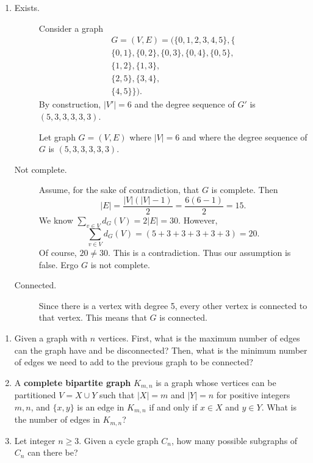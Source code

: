 \documentclass{article}
\theoremstyle{definition}
\begin{document}
\begin{solution}
\begin{enumerate}
\item\begin{description}
\item[Exists. ]Consider a graph
\begin{align*}
G=(V,E)=(\{0,1,2,3,4,5\},\{\\
\{0,1\},\{0,2\},\{0,3\},\{0,4\},\{0,5\},\\
\{1,2\},\{1,3\},\\
\{2,5\},\{3,4\},\\
\{4,5\}\}).
\end{align*}
By construction, $|V'|=6$ and the degree sequence of $G'$ is $(5,3,3,3,3,3)$.

Let graph $G=(V,E)$ where $|V|=6$ and where the degree sequence of $G$ is $(5,3,3,3,3,3)$.

\item[Not complete. ]Assume, for the sake of contradiction, that $G$ is complete. Then \[|E|=\frac{|V|(|V|-1)}{2}=\frac{6(6-1)}{2}=15.\] We know $\sum_{v\in V}{d_G(V)}=2|E|=30$. However, \[\sum_{v\in V}{d_G(V)}=(5+3+3+3+3+3)=20.\] Of course, $20\neq 30$. This is a contradiction. Thus our assumption is false. Ergo $G$ is not complete.
\item[Connected. ]Since there is a vertex with degree 5, every other vertex is connected to that vertex. This means that $G$ is connected.
\end{description}
\end{enumerate}
\end{solution}
\begin{question}
\begin{enumerate}
	\item Given a graph with $n$ vertices. First, what is the maximum number of edges can the graph have and be disconnected? Then, what is the minimum number of edges we need to add to the previous graph to be connected?
	\item A \textbf{complete bipartite graph} $K_{m,n}$ is a graph whose vertices can be partitioned $V=X\cup Y$ such that $|X|=m$ and  $|Y|=n$ for positive integers $m,n$, and $\{x, y\}$ is an edge in $K_{m,n}$ if and only if $x\in X$ and $y\in Y$. What is the number of edges in $K_{m,n}$?
	\item Let integer $n\geq 3$. Given a cycle graph $C_n$, how many possible subgraphs of $C_n$ can there be?
	\end{enumerate}
\end{question}
\end{document}
